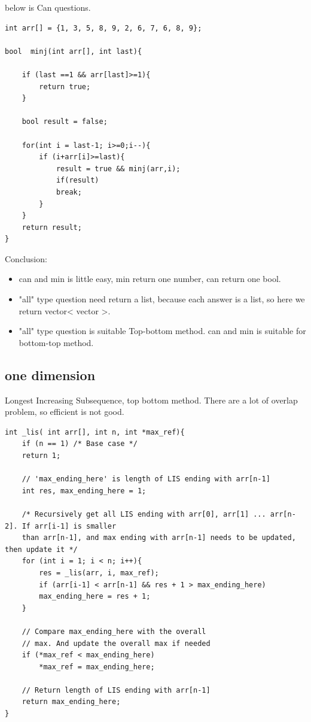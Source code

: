 \documentclass[a4paper,11pt,twoside]{book}
\begin{document}
	\par below is Can questions.  
\begin{lstlisting}[numbers=none]
int arr[] = {1, 3, 5, 8, 9, 2, 6, 7, 6, 8, 9};

bool  minj(int arr[], int last){
	
	if (last ==1 && arr[last]>=1){
		return true;
	}
	
	bool result = false;
	
	for(int i = last-1; i>=0;i--){
		if (i+arr[i]>=last){
			result = true && minj(arr,i);
			if(result)
			break;
		}
	}
	return result;
}		
\end{lstlisting} 	
	
	\par Conclusion:
	\begin{itemize}
		\item can and min is little easy, min return one number, can return one bool. 
		
		\item "all" type question need return a list, because each answer is a list, so here we return vector< vector >. 
		
		\item "all" type question is suitable Top-bottom method. can and min is suitable for bottom-top method.
	\end{itemize}
	

\subsection{one dimension}
	
	\par Longest Increasing Subsequence, top bottom method. There are a lot of overlap problem, so efficient is not good.
	
\begin{lstlisting}[numbers=none]
int _lis( int arr[], int n, int *max_ref){
	if (n == 1) /* Base case */
	return 1;
	
	// 'max_ending_here' is length of LIS ending with arr[n-1]
	int res, max_ending_here = 1;
	
	/* Recursively get all LIS ending with arr[0], arr[1] ... arr[n-2]. If arr[i-1] is smaller
	than arr[n-1], and max ending with arr[n-1] needs to be updated, then update it */
	for (int i = 1; i < n; i++){
		res = _lis(arr, i, max_ref);
		if (arr[i-1] < arr[n-1] && res + 1 > max_ending_here)
		max_ending_here = res + 1;
	}
	
	// Compare max_ending_here with the overall
	// max. And update the overall max if needed
	if (*max_ref < max_ending_here)
		*max_ref = max_ending_here;
	
	// Return length of LIS ending with arr[n-1]
	return max_ending_here;
}	
\end{lstlisting}	
	
\end{document}
